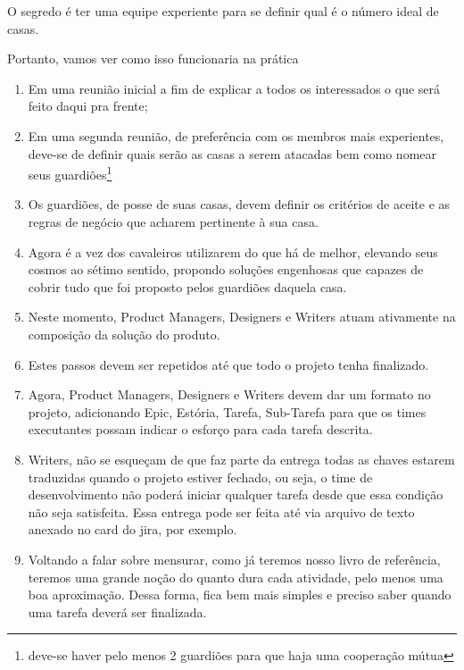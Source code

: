 O segredo é ter uma equipe experiente para se definir qual é o número ideal de casas.

Portanto, vamos ver como isso funcionaria na prática
\begin{enumerate}
    \item Em uma reunião inicial a fim de explicar a todos os interessados o que será feito daqui pra frente;
    \item Em uma segunda reunião, de preferência com os membros mais experientes, deve-se de definir quais serão as casas a serem atacadas bem como nomear seus guardiões\footnote{deve-se haver pelo menos 2 guardiões para que haja uma cooperação mútua}
    \item Os guardiões, de posse de suas casas, devem definir os critérios de aceite e as regras de negócio que acharem pertinente à sua casa.
    \item Agora é a vez dos cavaleiros utilizarem do que há de melhor, elevando seus cosmos ao sétimo sentido, propondo soluções engenhosas que capazes de cobrir tudo que foi proposto pelos guardiões daquela casa. 
    \item Neste momento, Product Managers, Designers e Writers atuam ativamente na composição da solução do produto.
    \item Estes passos devem ser repetidos até que todo o projeto tenha finalizado. 
    \item Agora, Product Managers, Designers e Writers devem dar um formato no projeto, adicionando Epic, Estória, Tarefa, Sub-Tarefa para que os times executantes possam indicar o esforço para cada tarefa descrita. 
    \item Writers, não se esqueçam de que faz parte da entrega todas as chaves estarem traduzidas quando o projeto estiver fechado, ou seja, o time de desenvolvimento não poderá iniciar qualquer tarefa desde que essa condição não seja satisfeita. Essa entrega pode ser feita até via arquivo de texto anexado no card do jira, por exemplo.
    \item Voltando a falar sobre mensurar, como já teremos nosso livro de referência, teremos uma grande noção do quanto dura cada atividade, pelo menos uma boa aproximação. Dessa forma, fica bem mais simples e preciso saber quando uma tarefa deverá ser finalizada.
\end{enumerate}
